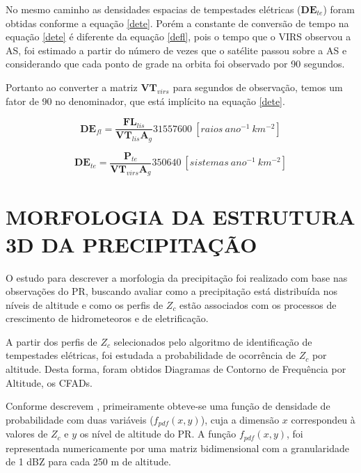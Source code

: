 No mesmo caminho as densidades espacias de tempestades elétricas ($\mathbf{DE}_{te}$) foram obtidas conforme a equação \ref{dete}. Porém a constante de conversão de tempo na equação \ref{dete} é diferente da equação \ref{defl}, pois o tempo que o VIRS observou a AS, foi estimado a partir do número de vezes que o satélite passou sobre a AS e considerando que cada ponto de grade na orbita foi observado por 90 segundos. 

Portanto ao converter a matriz $\mathbf{VT}_{virs}$ para segundos de observação, temos um fator de 90 no denominador, que está implícito na equação \ref{dete}. 


\begin{equation}
\mathbf{DE}_{fl} = \frac{\mathbf{FL}_{lis}}{\mathbf{VT}_{lis} \mathbf{A}_g} 31557600 ~[raios~ano^{-1}~km^{-2}]    
\label{defl}
\end{equation}

\begin{equation}
\mathbf{DE}_{te} = \frac{\mathbf{P}_{te}}{\mathbf{VT}_{virs} \mathbf{A}_g} 350640 ~[sistemas~ano^{-1}~km^{-2}]    
\label{dete}
\end{equation}

\section{MORFOLOGIA DA ESTRUTURA 3D DA PRECIPITAÇÃO}


O estudo para descrever a morfologia da precipitação foi realizado com base nas observações do PR, buscando avaliar como a precipitação está distribuída nos níveis de altitude e como os perfis de $Z_c$ estão associados com os processos de crescimento de hidrometeoros e de eletrificação.  

A partir dos perfis de $Z_c$ selecionados pelo algoritmo de identificação de tempestades elétricas, foi estudada a probabilidade de ocorrência de $Z_c$ por altitude. Desta forma, foram obtidos Diagramas de Contorno de Frequência por Altitude, os CFADs.

Conforme descrevem , primeiramente obteve-se uma função de densidade de probabilidade com duas variáveis ($f_{pdf}(x,y)$), cuja a dimensão $x$ correspondeu à valores de $Z_{c}$ e $y$ os nível de altitude do PR. A função $f_{pdf}(x,y)$, foi representada numericamente por uma matriz bidimensional com a granularidade de 1 dBZ para cada 250 m de altitude.

